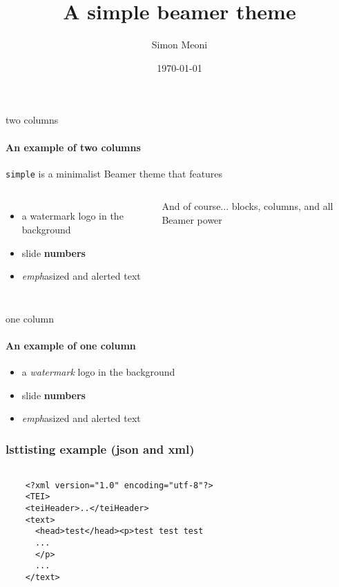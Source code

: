 \documentclass{beamer}
\title{A simple beamer theme}
\subtitle{}
\date{\today}
\author{Simon Meoni}
\begin{document}
\maketitle

\begin{frame}{two columns}
  \framesubtitle{An example of two columns}

  \texttt{simple} is a minimalist Beamer theme that features

  \begin{columns}
      \begin{itemize}
        \item a watermark logo in the background
        \item slide {\bf numbers}
        \item \emph{emph}asized and \alert{alert}ed text
      \end{itemize}

      \begin{block}{And of course...}
         blocks, columns, and all Beamer power
      \end{block}
  \end{columns}

\end{frame}

\begin{frame}{one column}
  \framesubtitle{An example of one column}
      \begin{itemize}
        \item a \emph{watermark} logo in the background
        \item slide {\bf numbers}
        \item \emph{emph}asized and \alert{alert}ed text
      \end{itemize}
\end{frame}

\begin{frame}[fragile]
  \frametitle{lsttisting example (json and xml)}
  \setlength\someheight{4cm}
  \lstset{language=XML}
  \begin{adjustbox}{width=\textwidth,height=\someheight,keepaspectratio}
    \begin{lstlisting}

    <?xml version="1.0" encoding="utf-8"?>
    <TEI>
    <teiHeader>..</teiHeader>
    <text>
      <head>test</head><p>test test test
      ...
      </p>
      ...
    </text>
    \end{lstlisting}
  \end{adjustbox}
\end{frame}
\end{document}
